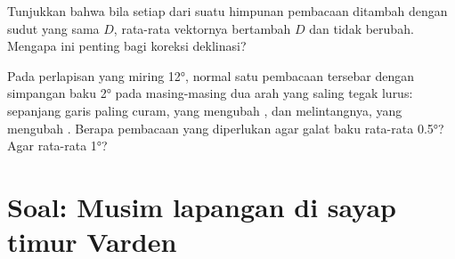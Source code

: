 \begin{exercise}[$\star\star\star$]\label{exo:b1:field-lab-methods-1:11}
Tunjukkan bahwa bila setiap  dari suatu himpunan pembacaan ditambah dengan sudut yang sama $D$,  rata-rata vektornya bertambah $D$ dan  tidak berubah. Mengapa ini penting bagi koreksi deklinasi?
\end{exercise}

\begin{exercise}[$\star\star\star$]\label{exo:b1:field-lab-methods-1:12}
Pada perlapisan yang miring \ang{12}, normal satu pembacaan tersebar dengan simpangan baku \ang{2} pada masing-masing dua arah yang saling tegak lurus: sepanjang garis  paling curam, yang mengubah , dan melintangnya, yang mengubah . Berapa pembacaan yang diperlukan agar galat baku  rata-rata \ang{0.5}? Agar  rata-rata \ang{1}?
\end{exercise}

\section{Soal: Musim lapangan di sayap timur Varden}

